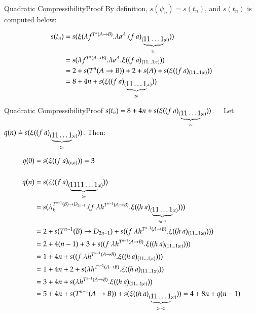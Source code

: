 \documentclass[9pt]{beamer}
\begin{document}
\begin{frame}{Quadratic Compressibility}{Proof}
By definition, $s(\psi_n) = s(t_n)$, and $s(t_n)$ is computed below:

\medskip
\begin{small}
\begin{align*}
s(t_n) & = s(\xi(\lambda f^{T^n(A \rightarrow B)}. \lambda a^A. (f \ a)_{(\underbrace{11\ldots 1}_{2n}; \epsilon)}))  \\
& = s(\lambda f^{T^n(A \rightarrow B)}. \lambda a^A. \xi((f \ a)_{(11\ldots 1; \epsilon)}))  \\
& = 2 + s(T^n(A \rightarrow B)) + 2 + s(A) + s(\xi((f \ a)_{(11\ldots 1; \epsilon)}))  \\
& = 8 + 4n + s(\xi((f \ a)_{(\underbrace{11\ldots 1}_{2n}; \epsilon)}))  \\
\end{align*} 
\end{small}
\end{frame}


\begin{frame}{Quadratic Compressibility}{Proof}
$
s(t_n) = 8 + 4n + s(\xi((f \ a)_{(\underbrace{11\ldots 1}_{2n}; \epsilon)}))
$. \ \  Let $q(n) \doteq s(\xi((f \ a)_{(\underbrace{11\ldots 1}_{2n}; \epsilon)}))$. Then:
\begin{small}
\begin{align*}
q(0) & = s(\xi((f \ a)_{(\epsilon; \epsilon)}))  =  3 \\
	   & \\
q(n) & = s(\xi((f \ a)_{(\underbrace{1111\ldots 1}_{2n}; \epsilon)}))  \\
 & = s( \lambda_k^{T^{n-1}(B) \rightarrow D_{2n-1}}.(f \ \lambda h^{T^{n-1}(A\rightarrow B)}.\xi((h \ a)_{(\underbrace{11\ldots 1}_{2n-2}; \epsilon)})))  \\
 & = 2 + s(T^{n-1}(B) \rightarrow D_{2n-1}) + s((f \ \lambda h^{T^{n-1}(A\rightarrow B)}.\xi((h \ a)_{(11\ldots 1; \epsilon)})))  \\
 & = 2 + 4(n-1) + 3 + s((f \ \lambda h^{T^{n-1}(A\rightarrow B)}.\xi((h \ a)_{(11\ldots 1; \epsilon)})))  \\
 & = 1 + 4n + s((f \ \lambda h^{T^{n-1}(A\rightarrow B)}.\xi((h \ a)_{(11\ldots 1; \epsilon)})))  \\
 & = 1 + 4n + 2 + s(\lambda h^{T^{n-1}(A\rightarrow B)}.\xi((h \ a)_{(11\ldots 1; \epsilon)}))  \\
 & = 3 + 4n + s(\lambda h^{T^{n-1}(A\rightarrow B)}.\xi((h \ a)_{(11\ldots 1; \epsilon)}))  \\
 & = 5 + 4n + s(T^{n-1}(A\rightarrow B)) + s(\xi((h \ a)_{(\underbrace{11\ldots 1}_{2n-2}; \epsilon)})) = 4 + 8n + q(n-1) 
\end{align*} 
\end{small}
\end{frame}
\end{document}
